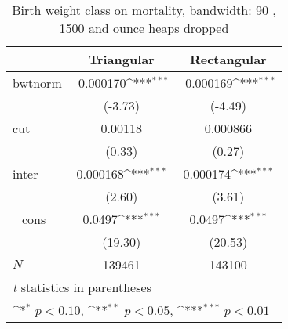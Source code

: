 \begin{table}[htbp]\centering
\def\sym#1{\ifmmode^{#1}\else\(^{#1}\)\fi}
\caption{Birth weight class on mortality, bandwidth: 90 , 1500 and ounce heaps dropped}
\begin{tabular}{l*{2}{c}}
\hline\hline
            &\multicolumn{1}{c}{Triangular}&\multicolumn{1}{c}{Rectangular}\\
\hline
bwtnorm     &   -0.000170\sym{***}&   -0.000169\sym{***}\\
            &     (-3.73)         &     (-4.49)         \\
[1em]
cut         &     0.00118         &    0.000866         \\
            &      (0.33)         &      (0.27)         \\
[1em]
inter       &    0.000168\sym{***}&    0.000174\sym{***}\\
            &      (2.60)         &      (3.61)         \\
[1em]
\_cons      &      0.0497\sym{***}&      0.0497\sym{***}\\
            &     (19.30)         &     (20.53)         \\
\hline
\(N\)       &      139461         &      143100         \\
\hline\hline
\multicolumn{3}{l}{\footnotesize \textit{t} statistics in parentheses}\\
\multicolumn{3}{l}{\footnotesize \sym{*} \(p<0.10\), \sym{**} \(p<0.05\), \sym{***} \(p<0.01\)}\\
\end{tabular}
\end{table}
